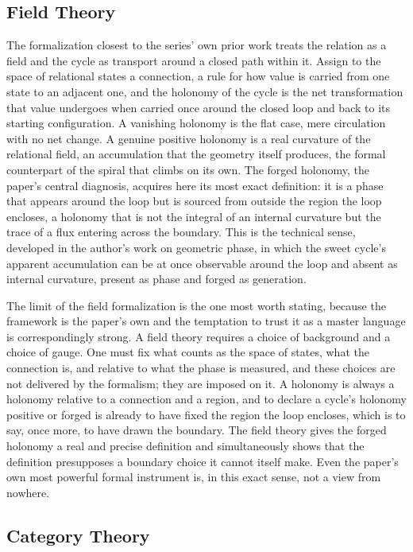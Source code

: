 \documentclass[11pt,a4paper]{article}
\begin{document}
\subsection{Field Theory}

The formalization closest to the series' own prior work treats the relation as a field and the cycle as transport around a closed path within it. Assign to the space of relational states a connection, a rule for how value is carried from one state to an adjacent one, and the holonomy of the cycle is the net transformation that value undergoes when carried once around the closed loop and back to its starting configuration. A vanishing holonomy is the flat case, mere circulation with no net change. A genuine positive holonomy is a real curvature of the relational field, an accumulation that the geometry itself produces, the formal counterpart of the spiral that climbs on its own. The forged holonomy, the paper's central diagnosis, acquires here its most exact definition: it is a phase that appears around the loop but is sourced from outside the region the loop encloses, a holonomy that is not the integral of an internal curvature but the trace of a flux entering across the boundary. This is the technical sense, developed in the author's work on geometric phase, in which the sweet cycle's apparent accumulation can be at once observable around the loop and absent as internal curvature, present as phase and forged as generation.

The limit of the field formalization is the one most worth stating, because the framework is the paper's own and the temptation to trust it as a master language is correspondingly strong. A field theory requires a choice of background and a choice of gauge. One must fix what counts as the space of states, what the connection is, and relative to what the phase is measured, and these choices are not delivered by the formalism; they are imposed on it. A holonomy is always a holonomy relative to a connection and a region, and to declare a cycle's holonomy positive or forged is already to have fixed the region the loop encloses, which is to say, once more, to have drawn the boundary. The field theory gives the forged holonomy a real and precise definition and simultaneously shows that the definition presupposes a boundary choice it cannot itself make. Even the paper's own most powerful formal instrument is, in this exact sense, not a view from nowhere.

\subsection{Category Theory}
\end{document}

